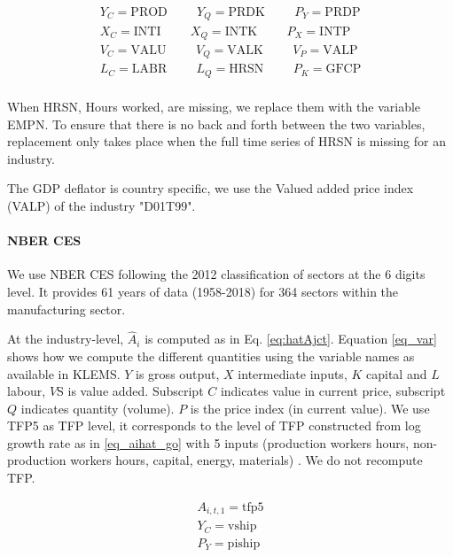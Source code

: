 \begin{align*}
Y_C=\text{PROD} \hspace{1cm}
Y_Q=\text{PRDK} \hspace{1cm}
P_Y=\text{PRDP}\\
X_C=\text{INTI} \hspace{1cm}
X_Q=\text{INTK} \hspace{1cm}
P_X=\text{INTP}\\
V_C=\text{VALU} \hspace{1cm}
V_Q=\text{VALK} \hspace{1cm}
V_P=\text{VALP}\\
L_C=\text{LABR} \hspace{1cm}
L_Q=\text{HRSN} \hspace{1cm}
P_K=\text{GFCP}\\
\end{align*}

When HRSN, Hours worked, are missing, we replace them with the variable EMPN. To ensure that there is no back and forth between the two variables, replacement only takes place when the full time series of HRSN is missing for an industry. 

The GDP deflator is country specific, we use the Valued added price index (VALP) of the industry "D01T99". 


\paragraph{NBER CES} We use NBER CES following the 2012 classification of sectors at the 6 digits level. It provides 61 years of data (1958-2018) for 364 sectors within the manufacturing sector.

At the industry-level, $\hat{A}_i$ is computed as in Eq. \ref{eq:hatAjct}. Equation \ref{eq_var} shows how we compute the different quantities using the variable names as available in KLEMS. $Y$ is gross output, $X$ intermediate inputs, $K$ capital and $L$ labour, $V$S is value added. Subscript $C$ indicates value in current price, subscript $Q$ indicates quantity (volume). $P$ is the price index (in current value). We use TFP5 as TFP level, it corresponds to the level of TFP constructed from log growth rate as in \ref{eq_aihat_go} with 5 inputs (production workers hours, non-production workers hours, capital, energy, materials) \citep{beckerNBERCESManufacturingIndustry2013}. We do not recompute TFP.

\begin{align*}
A_{i,t,1}=\text{tfp5}\\
Y_C=\text{vship}\\
P_Y=\text{piship}\\
\end{align*}

